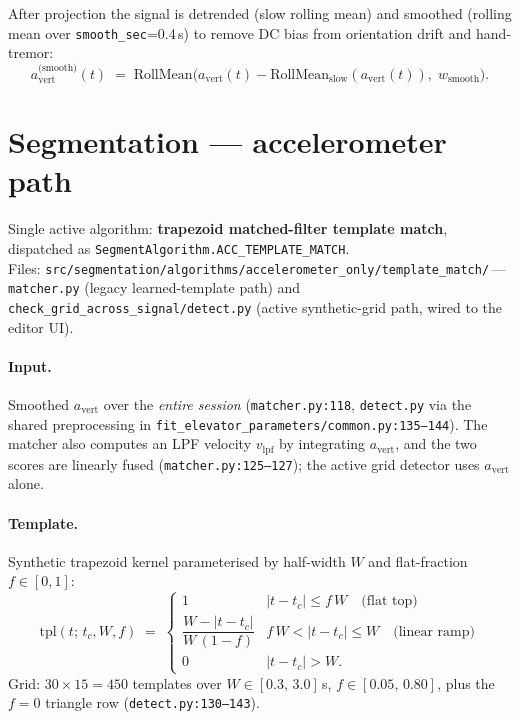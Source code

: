 \documentclass[11pt,a4paper]{article}
\newcommand{\avert}{a_{\mathrm{vert}}}
\begin{document}
After projection the signal is detrended (slow rolling mean) and
smoothed (rolling mean over \texttt{smooth\_sec}=0.4\,s) to remove
DC bias from orientation drift and hand-tremor:
\[
\avert^{\text{(smooth)}}(t) \;=\; \mathrm{RollMean}\bigl(\avert(t) - \mathrm{RollMean}_{\text{slow}}(\avert(t)),\; w_{\text{smooth}}\bigr).
\]

\section{Segmentation --- accelerometer path}

Single active algorithm: \textbf{trapezoid matched-filter template match}, dispatched as
\verb|SegmentAlgorithm.ACC_TEMPLATE_MATCH|.\\
Files:
\texttt{src/segmentation/algorithms/accelerometer\_only/template\_match/}\,---\,
\texttt{matcher.py} (legacy learned-template path) and
\texttt{check\_grid\_across\_signal/detect.py} (active synthetic-grid path,
wired to the editor UI).

\paragraph{Input.}
Smoothed $\avert$ over the \emph{entire session}
(\texttt{matcher.py:118}, \texttt{detect.py} via the shared
preprocessing in
\texttt{fit\_elevator\_parameters/common.py:135--144}). The matcher
also computes an LPF velocity $v_{\text{lpf}}$ by integrating
$\avert$, and the two scores are linearly fused
(\texttt{matcher.py:125--127}); the active grid detector uses
$\avert$ alone.

\paragraph{Template.}
Synthetic trapezoid kernel parameterised by half-width $W$ and
flat-fraction $f \in [0,1]$:
\[
\text{tpl}(t;\,t_c,W,f) \;=\;
\begin{cases}
1 & |t-t_c| \le f\,W \quad\text{(flat top)} \\[2pt]
\dfrac{W - |t-t_c|}{W\,(1-f)} & f\,W < |t-t_c| \le W \quad\text{(linear ramp)}\\[6pt]
0 & |t-t_c| > W.
\end{cases}
\]
Grid: $30 \times 15 = 450$ templates over $W \in [0.3,\,3.0]$\,s,
$f \in [0.05,\,0.80]$, plus the $f=0$ triangle row
(\texttt{detect.py:130--143}).
\end{document}
